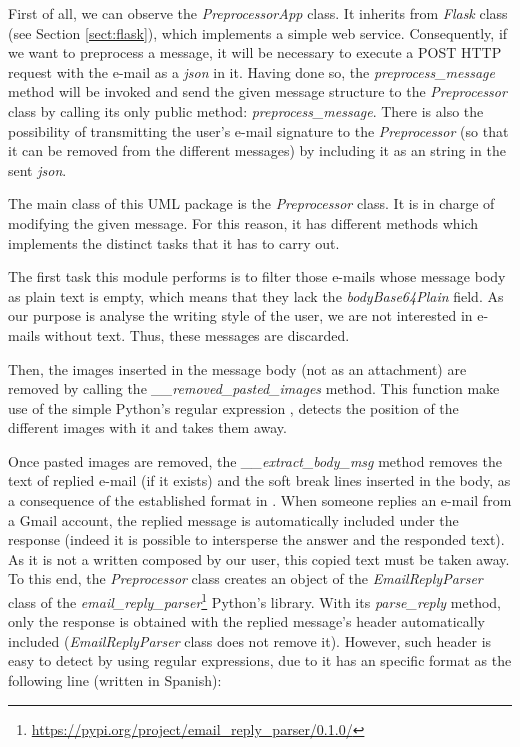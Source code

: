 First of all, we can observe the \textit{PreprocessorApp} class. It inherits from \textit{Flask} class (see Section \ref{sect:flask}), which implements a simple web service. Consequently, if we want to preprocess a message, it will be necessary to execute a POST HTTP request with the e-mail as a \textit{json} in it. Having done so, the \textit{preprocess\_message} method will be invoked and send the given message structure to the \textit{Preprocessor} class by calling its only public method: \textit{preprocess\_message}. There is also the possibility of transmitting the user's e-mail signature to the \textit{Preprocessor} (so that it can be removed from the different messages) by including it as an string in the sent \textit{json}.

The main class of this UML package is the \textit{Preprocessor} class. It is in charge of modifying the given message. For this reason, it has different methods which implements the distinct tasks that it has to carry out.

The first task this module performs is to filter those e-mails whose message body as plain text is empty, which means that they lack the \textit{bodyBase64Plain} field. As our purpose is analyse the writing style of the user, we are not interested in e-mails without text. Thus, these messages are discarded.

Then, the images inserted in the message body (not as an attachment) are removed by calling the \textit{\_\_removed\_pasted\_images} method. This function make use of the simple Python's regular expression \pythoninline{r'\\[image:[\^\\]]+\\]'}, detects the position of the different images with it and takes them away.

Once pasted images are removed, the \textit{\_\_extract\_body\_msg} method removes the text of replied e-mail (if it exists) and the soft break lines inserted in the body, as a consequence of the established format in \cite{rfc2646}. When someone replies an e-mail from a Gmail account, the replied message is automatically included under the response (indeed it is possible to intersperse the answer and the responded text). As it is not a written composed by our user, this copied text must be taken away. To this end, the \textit{Preprocessor} class creates an object of the \textit{EmailReplyParser} class of the \textit{email\_reply\_parser}\footnote{\url{https://pypi.org/project/email_reply_parser/0.1.0/}} Python's library. With its \textit{parse\_reply} method, only the response is obtained with the replied message's header automatically included (\textit{EmailReplyParser} class does not remove it). However, such header is easy to detect by using regular expressions, due to it has an specific format as the following line (written in Spanish):


